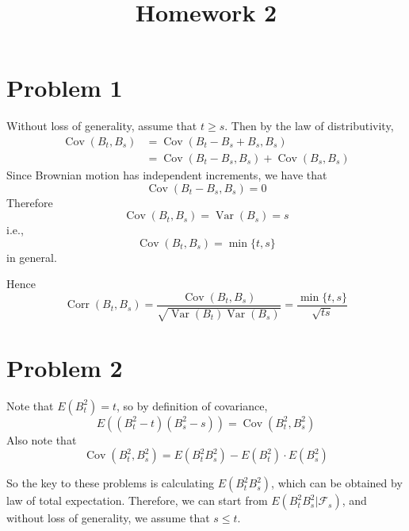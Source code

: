 \documentclass{homework}
\title{Homework 2}
\DeclareMathOperator{\Cov}{Cov}
\DeclareMathOperator{\Var}{Var}
\DeclareMathOperator{\Corr}{Corr}
\begin{document}
    \maketitle    

    \section{Problem 1}
    Without loss of generality, assume that $t\geq s$.
    Then by the law of distributivity,
    \begin{align*}
        \Cov(B_t,B_s)&=\Cov(B_t-B_s+B_s,B_s)\\
                     &=\Cov(B_t-B_s,B_s)+\Cov(B_s,B_s)
    \end{align*} 
    Since Brownian motion has independent increments,
    we have that
    \[\Cov(B_t-B_s,B_s)=0\]
    Therefore
    \[\Cov(B_t,B_s)=\Var(B_s)=s\]
    i.e.,
    \[\Cov(B_t,B_s)=\min\{t,s\}\]
    in general.

    Hence
    \[\Corr(B_t,B_s)=\frac{\Cov(B_t,B_s)}{\sqrt{\Var(B_t)\Var(B_s)}}
    =\frac{\min\{t,s\}}{\sqrt{ts}}\]

    \section{Problem 2}
    Note that $E\left(B_t^2\right)=t$, so by definition of
    covariance,
    \begin{equation}
        \label{eq:cov def}
        E\left((B_t^2-t)(B_s^2-s)\right)=\Cov(B_t^2,B_s^2)
    \end{equation}
    Also note that
    \begin{equation}
        \label{eq:cov formula}
        \Cov(B_t^2,B_s^2)=E(B_t^2B_s^2)-E(B_t^2)\cdot E(B_s^2)
    \end{equation}

    So the key to these problems is calculating $E(B_t^2B_s^2)$,
    which can be obtained by law of total expectation. Therefore,
    we can start from $E(B_t^2B_s^2|\mathcal F_s)$, and without
    loss of generality, we assume that $s\leq t$.
\end{document}
